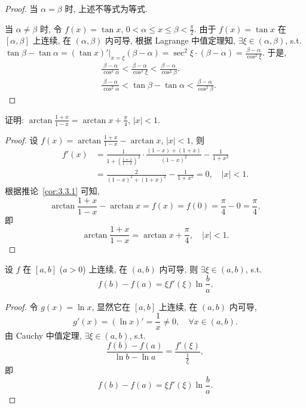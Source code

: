 \begin{proof}
当 $\alpha=\beta$ 时, 上述不等式为等式.

当 $\alpha\neq\beta$ 时, 令 $f(x)=\tan x$, $0<\alpha\leqslant x\leqslant\beta<\frac{\pi}{2}$. 由于 $f(x)=\tan x$ 在 $[\alpha,\beta]$ 上连续, 在 $(\alpha,\beta)$ 内可导, 根据 Lagrange 中值定理知, $\exists\xi\in(\alpha,\beta)$, s.t. $\tan\beta-\tan\alpha=(\tan x)'\big|_{x=\xi}(\beta-\alpha)=\sec^{2}\xi\cdot(\beta-\alpha)=\frac{\beta-\alpha}{\cos^{2}\xi}$. 于是,
\[
\begin{aligned}
&\frac{\beta-\alpha}{\cos^{2}\alpha}<\frac{\beta-\alpha}{\cos^{2}\xi}<\frac{\beta-\alpha}{\cos^{2}\beta}.\\
&\frac{\beta-\alpha}{\cos^{2}\alpha}<\tan\beta-\tan\alpha<\frac{\beta-\alpha}{\cos^{2}\beta}.
\end{aligned}
\]
\end{proof}

\begin{example}\label{ex:3.3.4}
证明: $\arctan\frac{1+x}{1-x}=\arctan x+\frac{\pi}{4}$, $|x|<1$.
\end{example}

\begin{proof}
设 $f(x)=\arctan\frac{1+x}{1-x}-\arctan x$, $|x|<1$, 则
\[
\begin{aligned}
f'(x)&=\frac{1}{1+\left(\frac{1+x}{1-x}\right)^{2}}\cdot\frac{(1-x)+(1+x)}{(1-x)^{2}}-\frac{1}{1+x^{2}}\\
&=\frac{2}{(1-x)^{2}+(1+x)^{2}}-\frac{1}{1+x^{2}}=0,\quad|x|<1.
\end{aligned}
\]
根据推论~\ref{cor:3.3.1} 可知,
\[
\arctan\frac{1+x}{1-x}-\arctan x=f(x)=f(0)=\frac{\pi}{4}-0=\frac{\pi}{4},
\]
即
\[
\arctan\frac{1+x}{1-x}=\arctan x+\frac{\pi}{4},\quad|x|<1.
\]
\end{proof}

\begin{example}\label{ex:3.3.5}
设 $f$ 在 $[a,b]$ ($a>0$) 上连续, 在 $(a,b)$ 内可导, 则 $\exists\xi\in(a,b)$, s.t.
\[
f(b)-f(a)=\xi f'(\xi)\ln\frac{b}{a}.
\]
\end{example}

\begin{proof}
令 $g(x)=\ln x$, 显然它在 $[a,b]$ 上连续, 在 $(a,b)$ 内可导,
\[
g'(x)=(\ln x)'=\frac{1}{x}\neq0,\quad\forall x\in(a,b).
\]
由 Cauchy 中值定理, $\exists\xi\in(a,b)$, s.t.
\[
\frac{f(b)-f(a)}{\ln b-\ln a}=\frac{f'(\xi)}{\frac{1}{\xi}},
\]
即
\[
f(b)-f(a)=\xi f'(\xi)\ln\frac{b}{a}.
\]
\end{proof}

